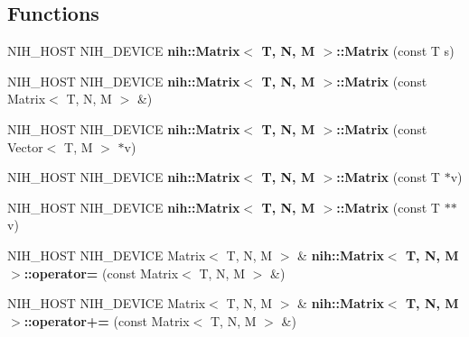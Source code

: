 \subsection*{\-Functions}
\begin{DoxyCompactItemize}
\item 
\hypertarget{group__linalg_gad99cac2fa7a266adca8e5465f27025cc}{
\-N\-I\-H\-\_\-\-H\-O\-S\-T \-N\-I\-H\-\_\-\-D\-E\-V\-I\-C\-E {\bfseries nih\-::\-Matrix$<$ T, N, M $>$\-::\-Matrix} (const \-T s)}
\label{group__linalg_gad99cac2fa7a266adca8e5465f27025cc}

\item 
\hypertarget{group__linalg_gaa7cf9f899c88482c15424af1275d6d08}{
\-N\-I\-H\-\_\-\-H\-O\-S\-T \-N\-I\-H\-\_\-\-D\-E\-V\-I\-C\-E {\bfseries nih\-::\-Matrix$<$ T, N, M $>$\-::\-Matrix} (const \-Matrix$<$ \-T, \-N, \-M $>$ \&)}
\label{group__linalg_gaa7cf9f899c88482c15424af1275d6d08}

\item 
\hypertarget{group__linalg_ga601e9514aa1a6e2e23b470be0e5fb4a5}{
\-N\-I\-H\-\_\-\-H\-O\-S\-T \-N\-I\-H\-\_\-\-D\-E\-V\-I\-C\-E {\bfseries nih\-::\-Matrix$<$ T, N, M $>$\-::\-Matrix} (const \-Vector$<$ \-T, \-M $>$ $\ast$v)}
\label{group__linalg_ga601e9514aa1a6e2e23b470be0e5fb4a5}

\item 
\hypertarget{group__linalg_ga3976c6f3ec3cf25394d133f7b87b885e}{
\-N\-I\-H\-\_\-\-H\-O\-S\-T \-N\-I\-H\-\_\-\-D\-E\-V\-I\-C\-E {\bfseries nih\-::\-Matrix$<$ T, N, M $>$\-::\-Matrix} (const \-T $\ast$v)}
\label{group__linalg_ga3976c6f3ec3cf25394d133f7b87b885e}

\item 
\hypertarget{group__linalg_gae3c59b44be7eeb23031a3d614fb6fb19}{
\-N\-I\-H\-\_\-\-H\-O\-S\-T \-N\-I\-H\-\_\-\-D\-E\-V\-I\-C\-E {\bfseries nih\-::\-Matrix$<$ T, N, M $>$\-::\-Matrix} (const \-T $\ast$$\ast$v)}
\label{group__linalg_gae3c59b44be7eeb23031a3d614fb6fb19}

\item 
\hypertarget{group__linalg_ga0dbf1c87533b9e9f78c6421ae43c33ec}{
\-N\-I\-H\-\_\-\-H\-O\-S\-T \-N\-I\-H\-\_\-\-D\-E\-V\-I\-C\-E \-Matrix$<$ \-T, \*
\-N, \-M $>$ \& {\bfseries nih\-::\-Matrix$<$ T, N, M $>$\-::operator=} (const \-Matrix$<$ \-T, \-N, \-M $>$ \&)}
\label{group__linalg_ga0dbf1c87533b9e9f78c6421ae43c33ec}

\item 
\hypertarget{group__linalg_ga08b2e9e0a7182126090bde9bc9744458}{
\-N\-I\-H\-\_\-\-H\-O\-S\-T \-N\-I\-H\-\_\-\-D\-E\-V\-I\-C\-E \-Matrix$<$ \-T, \*
\-N, \-M $>$ \& {\bfseries nih\-::\-Matrix$<$ T, N, M $>$\-::operator+=} (const \-Matrix$<$ \-T, \-N, \-M $>$ \&)}
\label{group__linalg_ga08b2e9e0a7182126090bde9bc9744458}


\end{DoxyCompactItemize}
